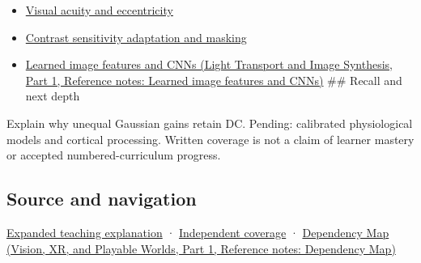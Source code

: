 \hypertarget{appendix-7281c15ac44a-used-by}{}

\begin{itemize}
\item
  \hyperref[appendix-b491fc48c54b]{Visual acuity and eccentricity}
\item
  \hyperref[appendix-b3aa9e8e01ad]{Contrast sensitivity adaptation and masking}
\item
  \href{../04-Light-Transport-and-Image-Synthesis-P01/main.pdf\#nameddest=appendix-47c51ea026fb}{Learned image features and CNNs (Light Transport and Image Synthesis, Part 1, Reference notes: Learned image features and CNNs)} \#\# Recall and next depth
\end{itemize}

Explain why unequal Gaussian gains retain DC. Pending: calibrated physiological models and cortical processing. Written coverage is not a claim of learner mastery or accepted numbered-curriculum progress.

\subsection{Source and navigation}\label{appendix-7281c15ac44a-source-and-navigation}

\hypertarget{appendix-7281c15ac44a-source-and-navigation}{}

\hyperref[04-visual-computing-ii-ch042-the-eye-is-an-optical-instrument-with-neural-processing-inside-it]{Expanded teaching explanation} · \hyperref[appendix-fd090d982a15-xr01---independent-seeing-and-representation-source]{Independent coverage} · \href{../07-Vision-XR-and-Playable-Worlds-P01/main.pdf\#nameddest=appendix-4ad47bdd269a}{Dependency Map (Vision, XR, and Playable Worlds, Part 1, Reference notes: Dependency Map)}
